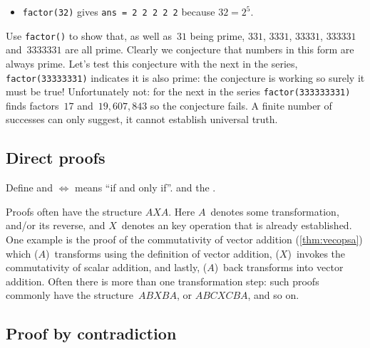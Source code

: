 \begin{draft}
\begin{example}
\begin{itemize}
\item \verb|factor(32)| gives \verb|ans = 2 2 2 2 2| because \(32=2^5\).
\end{itemize}
Use \verb|factor()| to show that, as well as~\(31\) being prime, \(331\), \(3331\), \(33331\), \(333331\) and~\(3333331\) are all prime.
Clearly we conjecture that numbers in this form are always prime.
Let's test this conjecture with the next in the series, \verb|factor(33333331)| indicates it is also prime: the conjecture is working so surely it must be true!
Unfortunately not: for the next in the series \verb|factor(333333331)| finds factors~\(17\) and~\(19,607,843\) so the conjecture fails.
A finite number of successes can only suggest, it cannot establish universal truth.
\end{example}









\subsection{Direct proofs}
\label{sec:dp}

\begin{comment}
Currently I only use ``iff'' from \S\ref{sec:iee} and thereafter.
Need to check on \(\iff\) use.
Define set notation, and in, and subset.
\end{comment}
Define  and \(\iff\) means ``if and only if''.
and the .

Proofs often have the structure \(AXA\).
Here \(A\)~denotes some transformation, and/or its reverse, and \(X\)~denotes an key operation that is already established.
One example is the proof of the commutativity of vector addition (\autoref{thm:vecopsa}) which (\(A\))~transforms using the definition of vector addition,  (\(X\))~invokes the commutativity of scalar addition, and lastly, (\(A\))~back transforms into vector addition.
Often there is more than one transformation step: such proofs commonly have the structure~\(ABXBA\), or \(ABCXCBA\), and so on.



\begin{comment}
SEbooklet.pdf has a couple of examples, and a possible approach to describe in understanding proofs.
\end{comment}



\subsection{Proof by contradiction}
\label{sec:pc}


\end{draft}
